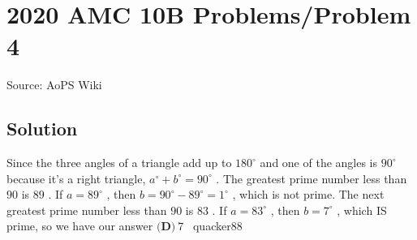 \documentclass[12pt]{article}
\begin{document}
\section*{{2020 AMC 10B Problems/Problem 4}}
Source: AoPS Wiki

\subsection*{Solution}
Since the three angles of a triangle add up to $180^{\circ}$ and one of the angles is $90^{\circ}$ because it's a right triangle, $a^{\circ} + b^{\circ} = 90^{\circ}$ . The greatest prime number less than $90$ is $89$ . If $a=89^{\circ}$ , then $b=90^{\circ}-89^{\circ}=1^{\circ}$ , which is not prime. The next greatest prime number less than $90$ is $83$ . If $a=83^{\circ}$ , then $b=7^{\circ}$ , which IS prime, so we have our answer $\boxed{\textbf{(D)}\ 7}$ ~quacker88
\end{document}
